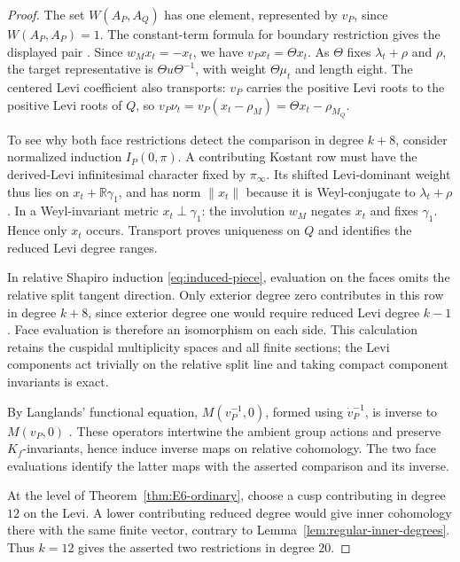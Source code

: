 \documentclass[12pt]{amsart}
\numberwithin{equation}{section}
\theoremstyle{plain}
\theoremstyle{definition}
\theoremstyle{remark}
\newcommand{\R}{\mathbb R}
\begin{document}
\begin{proof}
The set $W(A_P,A_Q)$ has one element, represented by $v_P$, since $W(A_P,A_P)=1$. The constant-term formula for boundary restriction gives the displayed pair \cite[\S3.2, p.~137]{Schwermer2021}. Since $w_Mx_t=-x_t$, we have $v_Px_t=\Theta x_t$. As $\Theta$ fixes $\lambda_t+\rho$ and $\rho$, the target representative is $\Theta u\Theta^{-1}$, with weight $\Theta\mu_t$ and length eight. The centered Levi coefficient also transports: $v_P$ carries the positive Levi roots to the positive Levi roots of $Q$, so $v_P\nu_t=v_P(x_t-\rho_M)=\Theta x_t-\rho_{M_Q}$.

To see why both face restrictions detect the comparison in degree $k+8$, consider normalized induction $I_P(0,\pi)$. A contributing Kostant row must have the derived-Levi infinitesimal character fixed by $\pi_\infty$. Its shifted Levi-dominant weight thus lies on $x_t+\R\gamma_1$, and has norm $\|x_t\|$ because it is Weyl-conjugate to $\lambda_t+\rho$. In a Weyl-invariant metric $x_t\perp\gamma_1$: the involution $w_M$ negates $x_t$ and fixes $\gamma_1$. Hence only $x_t$ occurs. Transport proves uniqueness on $Q$ and identifies the reduced Levi degree ranges.

In relative Shapiro induction \eqref{eq:induced-piece}, evaluation on the faces omits the relative split tangent direction. Only exterior degree zero contributes in this row in degree $k+8$, since exterior degree one would require reduced Levi degree $k-1$. Face evaluation is therefore an isomorphism on each side. This calculation retains the cuspidal multiplicity spaces and all finite sections; the Levi components act trivially on the relative split line and taking compact component invariants is exact.

By Langlands' functional equation, $M(v_P^{-1},0)$, formed using $\dot v_P^{-1}$, is inverse to $M(v_P,0)$ \cite[Thm.~7.2(a)]{Arthur2005}. These operators intertwine the ambient group actions and preserve $K_f$-invariants, hence induce inverse maps on relative cohomology. The two face evaluations identify the latter maps with the asserted comparison and its inverse.

At the level of Theorem~\ref{thm:E6-ordinary}, choose a cusp contributing in degree $12$ on the Levi. A lower contributing reduced degree would give inner cohomology there with the same finite vector, contrary to Lemma~\ref{lem:regular-inner-degrees}. Thus $k=12$ gives the asserted two restrictions in degree $20$.
\end{proof}
\end{document}
